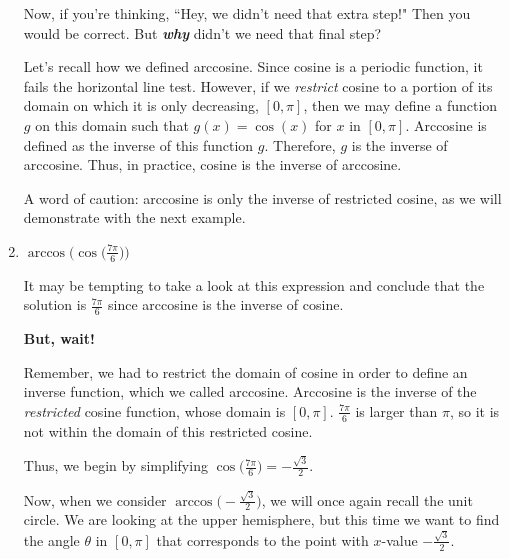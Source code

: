 \documentclass{ximera}
\begin{document}
\begin{example}
\begin{enumerate}
\begin{explanation}
Now, if you're thinking, ``Hey, we didn't need that extra step!" Then you would be correct. But \textbf{\textit{why}} didn't we need that final step?

Let's recall how we defined arccosine. Since cosine is a periodic function, it fails the horizontal line test. However, if we {\it restrict} cosine to a portion of its domain on which it is only decreasing, $[0,\pi]$, then we may define a function $g$ on this domain such that $g(x) = \cos(x)$ for $x$ in $[0,\pi]$. Arccosine is defined as the inverse of this function $g$. Therefore, $g$ is the inverse of arccosine. 
Thus, in practice, cosine is the inverse of arccosine. 

A word of caution: arccosine is only the inverse of restricted cosine, as we will demonstrate with the next example.

\end{explanation}
%
\item $\arccos\Big(\cos\Big(\frac{7\pi}{6}\Big)\Big)$

\begin{explanation}
It may be tempting to take a look at this expression and conclude that the solution is $\frac{7\pi}{6}$ since arccosine is the inverse of cosine. 

{\bf But, wait! }

Remember, we had to restrict the domain of cosine in order to define an inverse function, which we called arccosine. Arccosine is the inverse of the {\it restricted} cosine function, whose domain is $[0,\pi]$. $\frac{7\pi}{6}$ is larger than $\pi$, so it is not within the domain of this restricted cosine. 

Thus, we begin by simplifying $\cos\Big(\frac{7\pi}{6}\Big) = -\frac{\sqrt{3}}{2}$. 

Now, when we consider $\arccos\Big(-\frac{\sqrt{3}}{2}\Big)$, we will once again recall the unit circle. We are looking at the upper hemisphere, but this time we want to find the angle $\theta$ in $[0,\pi]$ that corresponds to the point with $x$-value $-\frac{\sqrt{3}}{2}$.
%
\begin{image}
\end{image}
\end{explanation}
\end{enumerate}
\end{example}
\end{document}
